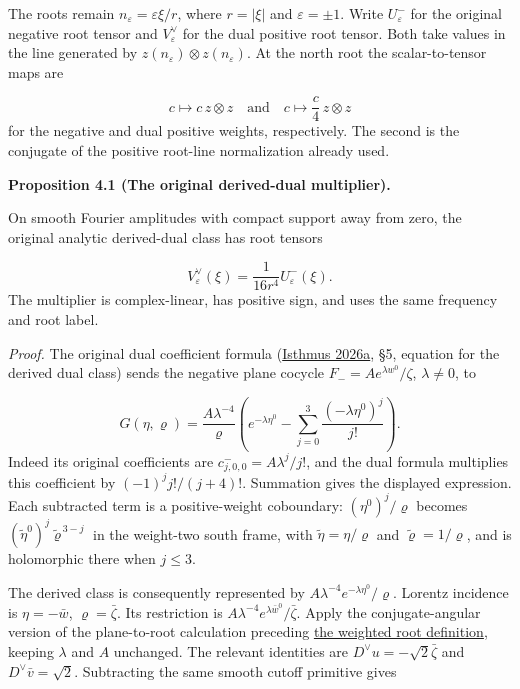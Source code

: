 \documentclass[
  english,
  11pt,
  reqno]{amsart}
\makeatletter
\newcommand{\pandocstatementheading}[1]{%
  \par\addpenalty{\@beginparpenalty}%
  \addvspace{.5\baselineskip plus .2\baselineskip minus .2\baselineskip}%
  {\normalfont\bfseries #1\par}%
  \nobreak\@afterindenttrue\@afterheading
}
\makeatother
\begin{document}
The roots remain \(n_\varepsilon=\varepsilon\xi/r\), where \(r=|\xi|\)
and \(\varepsilon=\pm1\). Write \(U^-_\varepsilon\) for the original
negative root tensor and \(V^\vee_\varepsilon\) for the dual positive
root tensor. Both take values in the line generated by
\(z(n_\varepsilon)\otimes z(n_\varepsilon)\). At the north root the
scalar-to-tensor maps are

\label{eq:online-dual-root-line-normalizations} \[
c\longmapsto c\,z\otimes z
\quad\text{and}\quad
c\longmapsto \frac c4\,z\otimes z
\] for the negative and dual positive weights, respectively. The second
is the conjugate of the positive root-line normalization already used.

\pandocstatementheading{\leavevmode{}\label{prop:online-original-negative-dual-calibration}Proposition 4.1 (The original derived-dual multiplier).}

On smooth Fourier amplitudes with compact support away from zero, the
original analytic derived-dual class has root tensors

\label{eq:online-negative-dual-calibrated-multiplier} \[
V^\vee_\varepsilon(\xi)=\frac1{16r^4}U^-_\varepsilon(\xi).
\] The multiplier is complex-linear, has positive sign, and uses the
same frequency and root label.

\emph{Proof.} The original dual coefficient formula
(\hyperref[ref-IsthmusLocal2026]{Isthmus 2026a}, §5, equation for the
derived dual class) sends the negative plane cocycle
\(F_-=A e^{\lambda w^0}/\zeta\), \(\lambda\ne0\), to

\label{eq:online-negative-plane-derived-dual} \[
G(\eta,\varrho)=\frac{A\lambda^{-4}}{\varrho}
\left(e^{-\lambda\eta^0}
-\sum_{j=0}^{3}\frac{(-\lambda\eta^0)^j}{j!}\right).
\] Indeed its original coefficients are \(c^-_{j,0,0}=A\lambda^j/j!\),
and the dual formula multiplies this coefficient by
\((-1)^j j!/(j+4)!\). Summation gives the displayed expression. Each
subtracted term is a positive-weight coboundary: \((\eta^0)^j/\varrho\)
becomes \((\tilde\eta^0)^j\tilde\varrho^{\,3-j}\) in the weight-two
south frame, with \(\tilde\eta=\eta/\varrho\) and
\(\tilde\varrho=1/\varrho\), and is holomorphic there when \(j\le3\).

The derived class is consequently represented by
\(A\lambda^{-4}e^{-\lambda\eta^0}/\varrho\). Lorentz incidence is
\(\eta=-\bar w\), \(\varrho=\bar\zeta\). Its restriction is
\(A\lambda^{-4}e^{\lambda\bar w^0}/\bar\zeta\). Apply the
conjugate-angular version of the plane-to-root calculation preceding
\hyperref[def:online-weighted-root-domain]{the weighted root
definition}, keeping \(\lambda\) and \(A\) unchanged. The relevant
identities are \(D^\vee u=-\sqrt2\bar\zeta\) and
\(D^\vee\bar v=\sqrt2\). Subtracting the same smooth cutoff primitive
gives
\end{document}
